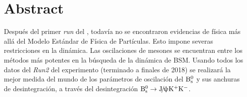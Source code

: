 \chapter{Abstract}

Después del primer \textit{run} 
del \lhc, 
todavía no se encontraron 
evidencias de física 
más allá del \color{vero} Modelo Estándar de Física de Partículas. \color{norm} 
Esto impone severas restricciones en la dinámica. 
Las oscilaciones de mesones se encuentran entre los métodos más potentes en la búsqueda de la dinámica de BSM. 
Usando todos los datos del \textit{Run2} del experimento \lhcb (terminado a finales de 2018) se realizará la mejor \color{vero} medida \color{norm} del mundo de los parámetros de oscilación del $\text{B}{}_{\text{s}}^{\text{0}}$ y sus anchuras de desintegración, a través del desintegración \color{vero} $\text{B}{}_{\text{s}}^{\text{0}} \rightarrow \text{J}\!/\!\uppsi \text{K}{}^{+}\text{K}{}^{-}$. \color{norm}

